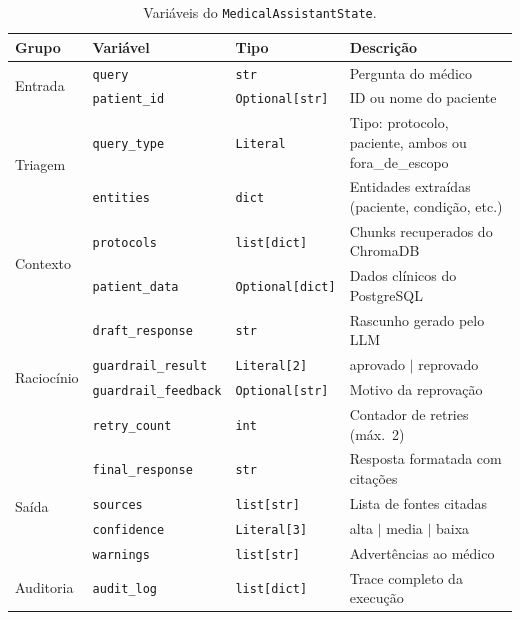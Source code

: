 \begin{table}[H]
\centering
\caption{Variáveis do \texttt{MedicalAssistantState}.}
\label{tab:state_schema}
\small
\begin{tabularx}{\textwidth}{l l l X}
\toprule
\textbf{Grupo} & \textbf{Variável} & \textbf{Tipo} & \textbf{Descrição} \\
\midrule
\multirow{2}{*}{Entrada}
    & \texttt{query} & \texttt{str} & Pergunta do médico \\
    & \texttt{patient\_id} & \texttt{Optional[str]} & ID ou nome do paciente \\
\midrule
\multirow{2}{*}{Triagem}
    & \texttt{query\_type} & \texttt{Literal} & Tipo: protocolo, paciente, ambos ou fora\_de\_escopo \\
    & \texttt{entities} & \texttt{dict} & Entidades extraídas (paciente, condição, etc.) \\
\midrule
\multirow{2}{*}{Contexto}
    & \texttt{protocols} & \texttt{list[dict]} & Chunks recuperados do ChromaDB \\
    & \texttt{patient\_data} & \texttt{Optional[dict]} & Dados clínicos do PostgreSQL \\
\midrule
\multirow{4}{*}{Raciocínio}
    & \texttt{draft\_response} & \texttt{str} & Rascunho gerado pelo LLM \\
    & \texttt{guardrail\_result} & \texttt{Literal[2]} & aprovado $|$ reprovado \\
    & \texttt{guardrail\_feedback} & \texttt{Optional[str]} & Motivo da reprovação \\
    & \texttt{retry\_count} & \texttt{int} & Contador de retries (máx.\ 2) \\
\midrule
\multirow{4}{*}{Saída}
    & \texttt{final\_response} & \texttt{str} & Resposta formatada com citações \\
    & \texttt{sources} & \texttt{list[str]} & Lista de fontes citadas \\
    & \texttt{confidence} & \texttt{Literal[3]} & alta $|$ media $|$ baixa \\
    & \texttt{warnings} & \texttt{list[str]} & Advertências ao médico \\
\midrule
Auditoria
    & \texttt{audit\_log} & \texttt{list[dict]} & Trace completo da execução \\
\bottomrule
\end{tabularx}
\end{table}

